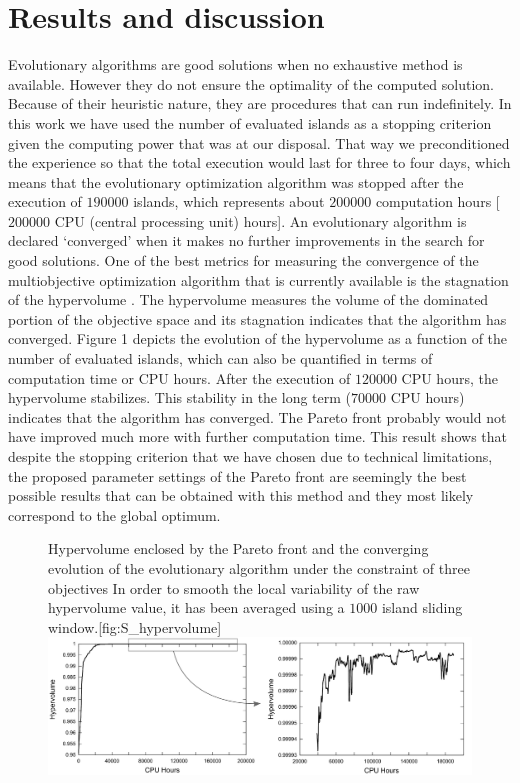 \section{Results and discussion}
\label{sec:results}

Evolutionary algorithms are good solutions when no exhaustive method is available. However they do not ensure the optimality of the computed solution. Because of their heuristic nature, they are procedures that can run indefinitely. In this work we have used the number of evaluated islands as a stopping criterion given the computing power that was at our disposal. That way we preconditioned the experience so that the total execution would last for three to four days, which means that the evolutionary optimization algorithm was stopped after the execution of $\num{190000}$ islands, which represents about $\num{200000}$ computation hours [$\num{200000}$ CPU (central processing unit) hours]. An evolutionary algorithm is declared ‘converged’ when it makes no further improvements in the search for good solutions. One of the best metrics for measuring the convergence of the multiobjective optimization algorithm that is currently available is the stagnation of the hypervolume \autocites{Fonseca2006,Naujoks2005,Zitzler1998}. The hypervolume measures the volume of the dominated portion of the objective space and its stagnation indicates that the algorithm has converged. Figure 1 depicts the evolution of the hypervolume as a function of the number of evaluated islands, which can also be quantified in terms of computation time or CPU hours. After the execution of $\num{120000}$ CPU hours, the hypervolume stabilizes. This stability in the long term ($\num{70000}$ CPU hours) indicates that the algorithm has converged. The Pareto front probably would not have improved much more with further computation time. This result shows that despite the stopping criterion that we have chosen due to technical limitations, the proposed parameter settings of the Pareto front are seemingly the best possible results that can be obtained with this method and they most likely correspond to the global optimum.

\begin{figure}[!htbp]
\begin{sidecaption}{Hypervolume enclosed by the Pareto front and the converging evolution of the evolutionary algorithm under the constraint of three objectives In order to smooth the local variability of the raw
hypervolume value, it has been averaged using a $\num{1000}$ island sliding window.}[fig:S_hypervolume]
  \centering
 \includegraphics[width=1.0\linewidth]{half_billion_simulation_fig1_hypervolume.png}
  \end{sidecaption}
\end{figure}

